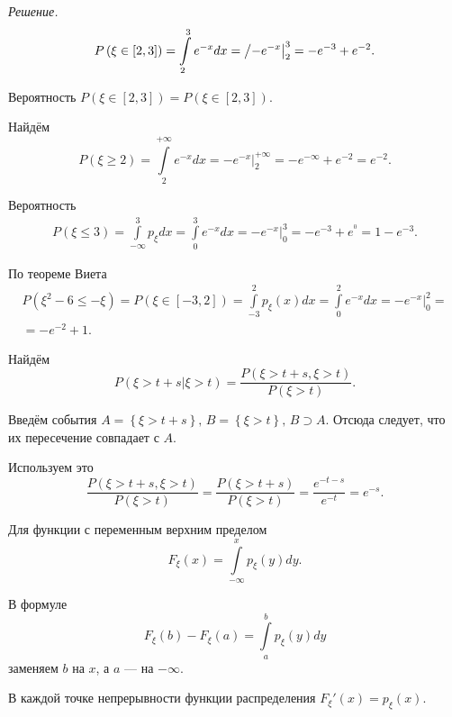 \textit{Решение.}
$$P \left( \xi \in \left[ 2, 3 \right] \right) =
\int \limits_2^3 e^{-x} dx =
\left/ -e^{-x} \right|_2^3 =
-e^{-3} +e^{-2}.$$

Вероятность $P \left( \xi \in \left[ 2, 3 \right] \right) = P \left( \xi \in \left[ 2, 3 \right] \right) $.

Найдём
$$P \left( \xi \geq 2 \right) =
\int \limits_2^{+ \infty }e^{-x} dx =
\left. -e^{-x} \right|_2^{+ \infty } =
-e^{- \infty } +e^{-2} =
e^{-2}.$$

Вероятность
\begin{equation*}
\begin{split}
P \left( \xi \leq 3 \right) =
\int \limits_{- \infty }^3 p_{ \xi }dx =
\int \limits_0^3e^{-x} dx =
\left. -e^{-x} \right|_0^3 =
-e^{-3} +e^^0 =
1 -e^{-3}.
\end{split}
\end{equation*}

По теореме Виета
\begin{equation*}
\begin{split}
P \left( \xi^2 - 6 \leq - \xi \right) =
P \left( \xi \in \left[ -3, 2 \right] \right) =
\int \limits_{-3}^2 p_{ \xi } \left( x \right) dx =
\int \limits_0^2e^{-x} dx =
\left. -e^{-x} \right|_0^2 = \\
= -e^{-2} + 1.
\end{split}
\end{equation*}

Найдём
$$P \left( \left. \xi > t + s \right| \xi > t \right) =
\frac{P \left( \xi > t + s, \xi > t \right) }{P \left( \xi > t \right) }.$$

Введём события $A = \left\{ \xi > t + s \right\}, \, B = \left\{ \xi > t \right\}, \, B \supset A$.
Отсюда следует, что их пересечение совпадает с $A$.

Используем это
$$ \frac{P \left( \xi > t + s, \xi > t \right) }{P \left( \xi > t \right) } =
\frac{P \left( \xi > t + s \right) }{P \left( \xi > t \right) } =
\frac{e^{-t-s}}{e^{-t}} =
e^{-s}.$$

Для функции с переменным верхним пределом
$$F_{ \xi } \left( x \right) =
\int \limits_{- \infty }^x p_{ \xi } \left( y \right) dy.$$

В формуле
$$F_{ \xi } \left( b \right) - F_{ \xi } \left( a \right) =
\int \limits_a^b p_{ \xi } \left( y \right) dy$$
заменяем $b$ на $x$, а $a$ --- на $- \infty $.

В каждой точке непрерывности функции распределения $F_{ \xi }' \left( x \right) = p_{ \xi } \left( x \right) $.

